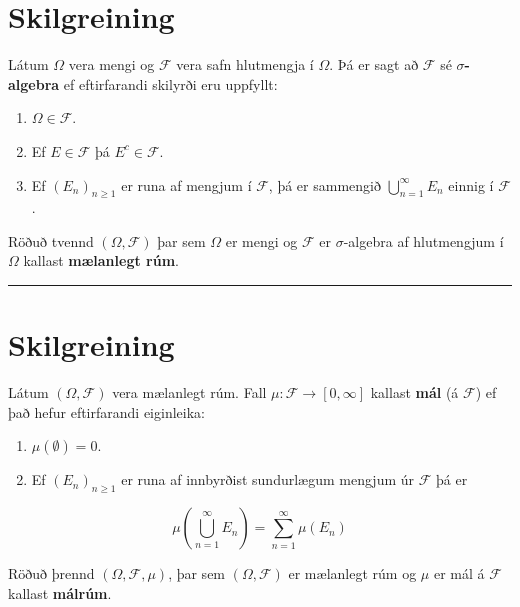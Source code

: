 \documentclass[]{book}
\begin{document}
\hypertarget{skilgreining-7}{%
\section{Skilgreining}\label{skilgreining-7}}

Látum \(\Omega\) vera mengi og \(\mathcal F\) vera safn hlutmengja í \(\Omega\). Þá er sagt að \(\mathcal F\) sé \(\sigma\)\textbf{-algebra} ef eftirfarandi skilyrði eru uppfyllt:

\begin{enumerate}
\def\labelenumi{\arabic{enumi}.}
\item
  \(\Omega \in \mathcal F\).
\item
  Ef \(E\in \mathcal F\) þá \(E^c \in \mathcal F\).
\item
  Ef \((E_n)_{n \geq 1}\) er runa af mengjum í \(\mathcal F\), þá er sammengið \(\bigcup_{n=1}^\infty E_n\) einnig í \(\mathcal F\).
\end{enumerate}

Röðuð tvennd \((\Omega, \mathcal F)\) þar sem \(\Omega\) er mengi og \(\mathcal F\) er \(\sigma\)-algebra af hlutmengjum í \(\Omega\) kallast \textbf{mælanlegt rúm}.

\begin{center}\rule{0.5\linewidth}{\linethickness}\end{center}

\hypertarget{skilgreining-8}{%
\section{Skilgreining}\label{skilgreining-8}}

Látum \((\Omega, \mathcal F)\) vera mælanlegt rúm. Fall \(\mu: \mathcal F \rightarrow [0, \infty]\) kallast \textbf{mál} (á \(\mathcal F\)) ef það hefur eftirfarandi eiginleika:

\begin{enumerate}
\def\labelenumi{\arabic{enumi}.}
\item
  \(\mu(\emptyset) = 0\).
\item
  Ef \((E_n)_{n\geq 1}\) er runa af innbyrðist sundurlægum mengjum úr \(\mathcal F\) þá er
\end{enumerate}

\[
\mu\left(\bigcup_{n=1}^\infty E_n \right) = \sum_{n=1}^\infty\mu(E_n)
\]

Röðuð þrennd \((\Omega, \mathcal F, \mu)\), þar sem \((\Omega, \mathcal F)\) er mælanlegt rúm og \(\mu\) er mál á \(\mathcal F\) kallast \textbf{málrúm}.
\end{document}
